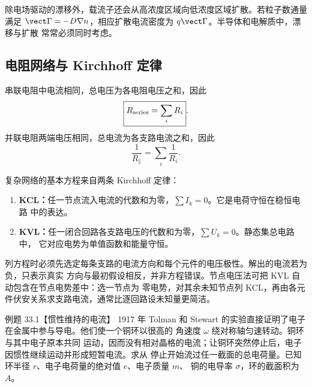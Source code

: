 \drudeDiagram

除电场驱动的漂移外，载流子还会从高浓度区域向低浓度区域扩散。若粒子数通量满足
$\vect\Gamma=-D\nabla n$，相应扩散电流密度为 $q\vect\Gamma$。半导体和电解质中，漂移与扩散
常常必须同时考虑。

\subsection*{电阻网络与 Kirchhoff 定律}

串联电阻中电流相同，总电压为各电阻电压之和，因此
\begin{equation}
  \boxed{R_{\rm series}=\sum_iR_i}.
\end{equation}
并联电阻两端电压相同，总电流为各支路电流之和，因此
\begin{equation}
  \boxed{\frac1{R_{\parallel}}=\sum_i\frac1{R_i}}.
\end{equation}

\resistorConnectionDiagram

复杂网络的基本方程来自两条 Kirchhoff 定律：
\begin{enumerate}[label=\arabic*.,leftmargin=2em]
  \item \textbf{KCL：}任一节点流入电流的代数和为零，$\sum I_k=0$。它是电荷守恒在稳恒电路
  中的表达。
  \item \textbf{KVL：}任一闭合回路各支路电压的代数和为零，$\sum U_k=0$。静态集总电路中，
  它对应电势为单值函数和能量守恒。
\end{enumerate}

\kirchhoffDiagram

列方程时必须先选定每条支路的电流方向和每个元件的电压极性。解出的电流若为负，只表示真实
方向与最初假设相反，并非方程错误。节点电压法可把 KVL 自动包含在节点电势差中：选一节点为
零电势，对其余未知节点列 KCL，再由各元件伏安关系求支路电流，通常比逐回路设未知量更简洁。

\fi

\Needspace{0.38\textheight}
\begin{origexamplebox}{例题 33.1【惯性维持的电流】}
1917 年 Tolman 和 Stewart 的实验直接证明了电子在金属中参与导电。他们使一个铜环以很高的
角速度 $\omega$ 绕对称轴匀速转动。铜环与其中电子原本共同
运动，因而没有相对晶格的电流；让铜环突然停止后，电子因惯性继续运动并形成短暂电流。求从
停止开始流过任一截面的总电荷量。已知环半径 $r$、电子电荷量的绝对值 $e$、电子质量 $m$、
铜的电导率 $\sigma$，环的截面积为 $A$。
\end{origexamplebox}

